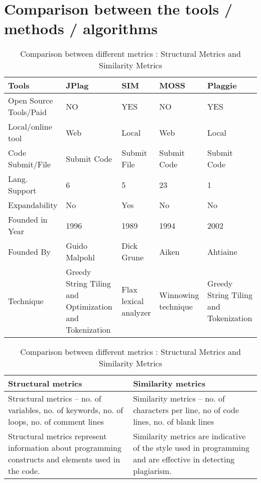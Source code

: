 			\section{Comparison between the tools / methods / algorithms}
			
			\begin{table}[h!]
			  \centering
			  \caption{Compression of four source code detection tools with its characteristics, function and technique}
			  \label{tab:table1}
			  \begin{tabular}{|p{3cm}|p{3cm}|p{3cm}|p{3cm}|p{3cm}|}
			\hline 
			Tools & JPlag & SIM & MOSS & Plaggie \\ \hline
			
			Open Source Tools/Paid & NO & YES & NO & YES \\ \hline
			Local/online tool & Web & Local & Web & Local  \\ \hline
			Code Submit/File & Submit Code & Submit File & Submit
			Code & Submit Code  \\ \hline
			Lang. Support & 6 & 5 & 23 & 1 \\ \hline
			Expandability & No & Yes & No & No \\ \hline
			Founded in Year & 1996 & 1989 & 1994 & 2002 \\ \hline
			Founded By  & Guido Malpohl & Dick Grune & Aiken & Ahtiaine \\ \hline
			
			Technique & Greedy String Tiling and Optimization and Tokenization & Flax lexical analyzer & Winnowing technique & Greedy String Tiling and Tokenization \\ \hline	\end{tabular}
			
			\vspace{5 mm}
			
			  \centering
			  \caption{Comparison between different metrics : Structural Metrics and Similarity Metrics}
			  \label{tab:table2}
			  \begin{tabular}{|p{6cm}|p{6cm}|}
			\hline 
			Structural metrics & Similarity metrics  \\ \hline
			
			Structural metrics – no. of variables, no. of keywords, no. of loops, no. of comment lines & Similarity metrics – no. of characters per line, no of code lines, no. of blank lines \\ \hline
			
			Structural metrics represent information about programming constructs and elements used in the code. & Similarity metrics are indicative of the style used in programming and are effective in detecting plagiarism. \\ \hline	
			

\end{tabular}
\end{table}
